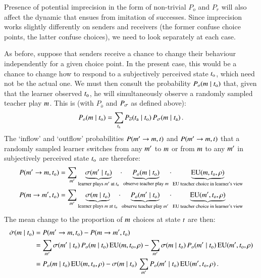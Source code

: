 \documentclass[12pt,english]{article}
\numberwithin{equation}{section}
\begin{document}
\begin{appendices}
Presence of potential imprecision in the form of non-trivial $P_o$ and $P_r$ will also affect
the dynamic that ensues from imitation of successes. Since imprecision works slightly
differently on senders and receivers (the former confuse choice points, the latter confuse
choices), we need to look separately at each case.

As before, suppose that senders receive a chance to change their behaviour independently for a
given choice point. In the present case, this would be a chance to change how to respond to a
subjectively perceived state $t_{\mathrm{o}}$, which need not be the actual one. We must then
consult the probability $P_o(m \mid t_{\mathrm{o}})$ that, given that the learner
observed $t_{\mathrm{o}}$, he will simultaneously observe a randomly sampled teacher play
$m$. This is (with $P_{\overline{o}}$ and $P_{\sigma}$ as defined above):
\begin{align*}
  P_o(m \mid t_{\mathrm{o}}) = \sum_{t_{\mathrm{a}}} P_{\overline{o}}(t_{\mathrm{a}}
  \mid t_{\mathrm{o}}) \thinspace P_{\sigma}(m \mid t_{\mathrm{a}})\,.
\end{align*}
The `inflow' and `outflow' probabilities $P(m' \rightarrow m, t)$ and
$P(m' \rightarrow m, t)$ that a randomly sampled learner switches from any
$m'$ to $m$ or from $m$ to any $m'$ in subjectively perceived state
$t_{\mathrm{o}}$ are therefore:
\begin{align*}
  P(m' \rightarrow m, t_{\mathrm{o}}) & = \sum_{m'} \underbrace{\sigma(m' \mid
    t_{\mathrm{o}})}_{\text{learner plays $m'$ at $t_{\mathrm{o}}$}} \cdot
  \underbrace{P_{o}(m \mid t_{\mathrm{o}})}_{\text{observe teacher play $m$}} \cdot
  \underbrace{\mathrm{EU}(m, t_{\mathrm{o}}, \rho)}_{\text{EU teacher choice in learner's view}}
  \\
  P(m \rightarrow m', t_{\mathrm{o}}) & = \sum_{m'} \underbrace{\sigma(m \mid
    t_{\mathrm{o}})}_{\text{learner plays $m$ at $t_{\mathrm{o}}$}} \cdot
  \underbrace{P_{o}(m' \mid t_{\mathrm{o}})}_{\text{observe teacher play $m'$}} \cdot
  \underbrace{\mathrm{EU}(m', t_{\mathrm{o}}, \rho)}_{\text{EU teacher choice in learner's view}}
\end{align*}
The mean change to the proportion of $m$ choices at state $t$ are then:
\begin{align}
  \label{eq:nRDSender}
  \dot{\sigma}(m \mid t_{\mathrm{o}}) & = P(m' \rightarrow m, t_{\mathrm{o}}) - P(m
  \rightarrow m', t_{\mathrm{o}}) \nonumber \\
  & = \sum_{m'} \sigma(m' \mid t_{\mathrm{o}}) \thinspace P_o(m \mid
  t_{\mathrm{o}}) \thinspace \mathrm{EU}(m, t_{\mathrm{o}}, \rho) - \sum_{m'} \sigma(m \mid t_{\mathrm{o}}) \thinspace
  P_o(m' \mid t_{\mathrm{o}}) \thinspace \mathrm{EU}(m', t_{\mathrm{o}}, \rho) \nonumber \\
  & = P_o(m \mid t_{\mathrm{o}}) \thinspace \mathrm{EU}(m, t_{\mathrm{o}}, \rho) - \sigma(m \mid t_{\mathrm{o}}) \thinspace \sum_{m'} P_o(m' \mid t_{\mathrm{o}}) \thinspace \mathrm{EU}(m', t_{\mathrm{o}}, \rho)\,.
\end{align}



\end{appendices}
\end{document}
